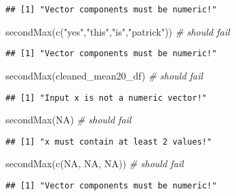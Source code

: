 \documentclass[
]{article}
\newenvironment{Shaded}{\begin{snugshade}}{\end{snugshade}}
\newcommand{\CommentTok}[1]{\textcolor[rgb]{0.56,0.35,0.01}{\textit{#1}}}
\newcommand{\ConstantTok}[1]{\textcolor[rgb]{0.00,0.00,0.00}{#1}}
\newcommand{\FunctionTok}[1]{\textcolor[rgb]{0.00,0.00,0.00}{#1}}
\newcommand{\NormalTok}[1]{#1}
\newcommand{\StringTok}[1]{\textcolor[rgb]{0.31,0.60,0.02}{#1}}
\begin{document}
\begin{verbatim}
## [1] "Vector components must be numeric!"
\end{verbatim}

\begin{Shaded}
\begin{Highlighting}[]
\FunctionTok{secondMax}\NormalTok{(}\FunctionTok{c}\NormalTok{(}\StringTok{"yes"}\NormalTok{,}\StringTok{"this"}\NormalTok{,}\StringTok{"is"}\NormalTok{,}\StringTok{"patrick"}\NormalTok{)) }\CommentTok{\# should fail}
\end{Highlighting}
\end{Shaded}

\begin{verbatim}
## [1] "Vector components must be numeric!"
\end{verbatim}

\begin{Shaded}
\begin{Highlighting}[]
\FunctionTok{secondMax}\NormalTok{(cleaned\_mean20\_df) }\CommentTok{\# should fail}
\end{Highlighting}
\end{Shaded}

\begin{verbatim}
## [1] "Input x is not a numeric vector!"
\end{verbatim}

\begin{Shaded}
\begin{Highlighting}[]
\FunctionTok{secondMax}\NormalTok{(}\ConstantTok{NA}\NormalTok{) }\CommentTok{\# should fail}
\end{Highlighting}
\end{Shaded}

\begin{verbatim}
## [1] "x must contain at least 2 values!"
\end{verbatim}

\begin{Shaded}
\begin{Highlighting}[]
\FunctionTok{secondMax}\NormalTok{(}\FunctionTok{c}\NormalTok{(}\ConstantTok{NA}\NormalTok{, }\ConstantTok{NA}\NormalTok{, }\ConstantTok{NA}\NormalTok{)) }\CommentTok{\# should fail}
\end{Highlighting}
\end{Shaded}

\begin{verbatim}
## [1] "Vector components must be numeric!"
\end{verbatim}
\end{document}
